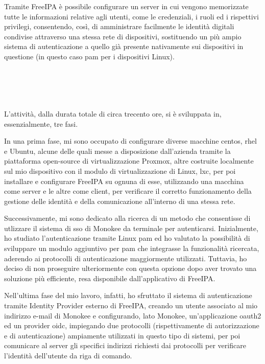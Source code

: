 Tramite FreeIPA è possibile configurare un server in cui vengono memorizzate tutte le informazioni relative agli utenti, come le credenziali, i ruoli ed i rispettivi privilegi, consentendo, così, di amministrare facilmente le identità digitali condivise attraverso una stessa rete di dispositivi, sostituendo un più ampio sistema di autenticazione a quello già presente nativamente sui dispositivi in questione (in questo caso \acrshort{pam} per i dispositivi Linux). 


\\ \\
\\ \\
L'attività, dalla durata totale di circa trecento ore, si è sviluppata in, essenzialmente, tre fasi.

In una prima fase, mi sono occupato di configurare diverse macchine \acrfull{centos}, \acrfull{rhel} e Ubuntu,
alcune delle quali messe a disposizione dall'azienda tramite la piattaforma open-source di virtualizzazione Proxmox, altre costruite localmente sul mio dispositivo con il modulo di virtualizzazione di Linux, \acrfull{lxc}, per poi installare e configurare FreeIPA su ognuna di esse, utilizzando una macchina come server e le altre come client, per verificare il corretto funzionamento della gestione delle identità e della comunicazione all'interno di una stessa rete.

Successivamente, mi sono dedicato alla ricerca di un metodo che consentisse di utlizzare il sistema di \acrshort{sso} di Monokee da terminale per autenticarsi. Inizialmente, ho studiato l'autenticazione tramite Linux \acrshort{pam} ed ho valutato la possibilità di sviluppare un modulo aggiuntivo per \acrshort{pam} che integrasse la funzionalità ricercata, aderendo ai protocolli di autenticazione maggiormente utilizzati. Tuttavia, ho deciso di non proseguire ulteriormente con questa opzione dopo aver trovato una soluzione più efficiente, resa disponibile dall'applicativo di FreeIPA.

Nell'ultima fase del mio lavoro, infatti, ho sfruttato il sistema di autenticazione tramite Identity Provider esterno di FreeIPA, creando un utente associato al mio indirizzo e-mail di Monokee e configurando, lato Monokee, un'applicazione \acrfull{oauth2} ed un provider \acrfull{oidc}, impiegando due protocolli (rispettivamente di autorizzazione e di autenticazione) ampiamente utilizzati in questo tipo di sistemi, per poi comunicare al server gli specifici indirizzi richiesti dai protocolli per verificare l'identità dell'utente da riga di comando.

